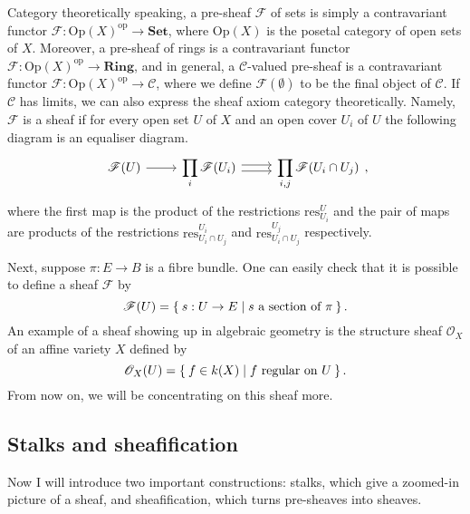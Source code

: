\begin{bcat}
  Category theoretically speaking, a pre-sheaf $\mathscr{F}$ of sets is
  simply a contravariant functor $\mathscr{F}:\text{Op}(X)^{\text{op}}
  \to\mathbf{Set}$, where $\text{Op}(X)$ is the posetal category of
  open sets of $X$. Moreover, a pre-sheaf of rings is a contravariant functor
  $\mathscr{F}:\text{Op}(X)^{\text{op}}\to \mathbf{Ring}$, and in general,
  a $\mathscr{C}$-valued pre-sheaf is a contravariant functor
  $\mathscr{F}:\text{Op}(X)^{\text{op}}\to\mathscr{C}$, where we define
  $\mathscr{F}(\emptyset)$ to be the final object of $\mathscr{C}$.
  If $\mathscr{C}$ has limits, we can also express the sheaf axiom category
  theoretically. Namely, $\mathscr{F}$ is a sheaf if for every
  open set $U$ of $X$ and an open cover $U_{i}$ of $U$ the following
  diagram is an equaliser diagram.
  \begin{equation}\label{diag:sheaf_eq}\begin{tikzcd}
      \mathscr{F}(U)\rar
      & \displaystyle\prod_{i}\mathscr{F}(U_{i})\rar[shift left]\rar[shift right]
      & \displaystyle\prod_{i,j}\mathscr{F}(U_{i}\cap U_{j})
    \end{tikzcd},\end{equation}
  where the first map is the product of the restrictions
  $\text{res}_{U_{i}}^{U}$ and the pair of maps are products of the
  restrictions $\text{res}_{U_{i}\cap U_{j}}^{U_{i}}$ and
  $\text{res}_{U_{i}\cap U_{j}}^{U_{j}}$ respectively.
\end{bcat}

Next, suppose $\pi: E\to B$ is a fibre bundle. One can easily check that
it is possible to define a sheaf $\mathscr{F}$ by
\[
  \mathscr{F}(U) = \Set{s:U\to E\mid s\text{ a section of }\pi}.
\]
An example of a sheaf showing up in algebraic geometry is the structure
sheaf $\mathscr{O}_{X}$ of an affine variety $X$ defined by
\[
  \mathscr{O}_{X}(U)=\Set{f\in k(X)\mid f\text{ regular on } U}.
\]
From now on, we will be concentrating on this sheaf more.

\subsection{Stalks and sheafification}
Now I will introduce two important constructions: stalks, which give a
zoomed-in picture of a sheaf, and sheafification, which turns pre-sheaves
into sheaves.

